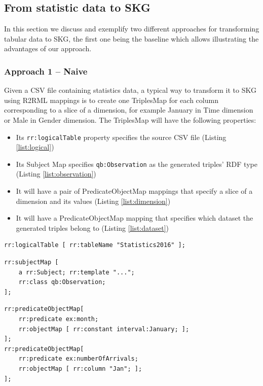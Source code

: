 \subsection{From statistic data to SKG}
In this section we discuss and exemplify two different approaches for transforming tabular data to SKG, the first one being the baseline which allows illustrating the advantages of our approach.

\subsubsection{Approach 1 -- Naive}
Given a CSV file containing statistics data, a typical way to transform it to SKG using R2RML mappings is to create one TriplesMap for each column corresponding to a slice of a dimension, for example January in Time dimension or Male in Gender dimension. The TriplesMap will have the following properties:
\begin{itemize}
\item Its \texttt{rr:logicalTable} property specifies the source CSV file (Listing \ref{list:logical})
\item Its Subject Map specifies \texttt{qb:Observation} as the generated triples’ RDF type (Listing \ref{list:observation})
\item It will have a pair of PredicateObjectMap mappings that specify a slice of a dimension and its values (Listing \ref{list:dimension})
\item It will have a PredicateObjectMap mapping that specifies which dataset the generated triples belong to (Listing \ref{list:dataset})
\end{itemize}
\lstset{upquote=true}
\begin{lstlisting}[float,caption=Data source mapping,frame=tlrb,label={list:logical}, columns=fullflexible]
rr:logicalTable [ rr:tableName "Statistics2016" ];
\end{lstlisting}

\begin{lstlisting}[float,caption=Observation mapping,frame=tlrb,label={list:observation}, columns=fullflexible]
rr:subjectMap [ 
    a rr:Subject; rr:template "..."; 
    rr:class qb:Observation; 
];
\end{lstlisting}

\begin{lstlisting}[float,caption=Dimension slice mapping,frame=tlrb,label={list:dimension}, columns=fullflexible]
rr:predicateObjectMap[ 
    rr:predicate ex:month; 
    rr:objectMap [ rr:constant interval:January; ];  
];
rr:predicateObjectMap[ 
    rr:predicate ex:numberOfArrivals; 
    rr:objectMap [ rr:column "Jan"; ]; 
];
\end{lstlisting}

